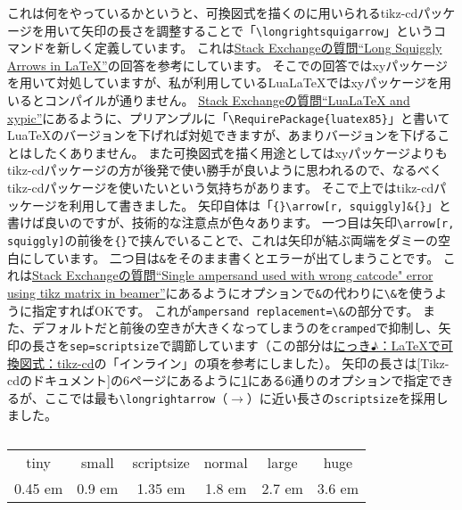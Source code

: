 \documentclass[11pt,a4paper,oneside,lualatex]{ltjsarticle} %
\newcommand{\longrightsquigarrow}{\begin{tikzcd}[cramped,sep=scriptsize,ampersand replacement=\&]{}\arrow[r, squiggly]\&{}\end{tikzcd}}
\numberwithin{equation}{section} %
\begin{document}
これは何をやっているかというと、可換図式を描くのに用いられるtikz-cdパッケージを用いて矢印の長さを調整することで「\verb|\longrightsquigarrow|」というコマンドを新しく定義しています。
これは\href{https://tex.stackexchange.com/questions/99017/long-squiggly-arrows-in-latex}{Stack Exchangeの質問``Long Squiggly Arrows in LaTeX''}の回答を参考にしています。
そこでの回答ではxyパッケージを用いて対処していますが、私が利用しているLuaLaTeXではxyパッケージを用いるとコンパイルが通りません。
\href{https://tex.stackexchange.com/questions/328602/lualatex-and-xypic}{Stack Exchangeの質問``LuaLaTeX and xypic''}にあるように、プリアンプルに「\verb|\RequirePackage{luatex85}|」と書いてLuaTeXのバージョンを下げれば対処できますが、あまりバージョンを下げることはしたくありません。
また可換図式を描く用途としてはxyパッケージよりもtikz-cdパッケージの方が後発で使い勝手が良いように思われるので、なるべくtikz-cdパッケージを使いたいという気持ちがあります。
そこで上ではtikz-cdパッケージを利用して書きました。
矢印自体は「\verb|{}\arrow[r, squiggly]&{}|」と書けば良いのですが、技術的な注意点が色々あります。
一つ目は矢印\verb|\arrow[r, squiggly]|の前後を\verb|{}|で挟んでいることで、これは矢印が結ぶ両端をダミーの空白にしています。
二つ目は\verb|&|をそのまま書くとエラーが出てしまうことです。
これは\href{https://tex.stackexchange.com/questions/15093/single-ampersand-used-with-wrong-catcode-error-using-tikz-matrix-in-beamer}{Stack Exchangeの質問``Single ampersand used with wrong catcode" error using tikz matrix in beamer''}にあるようにオプションで\verb|&|の代わりに\verb|\&|を使うように指定すればOKです。
これが\verb|ampersand replacement=\&|の部分です。
また、デフォルトだと前後の空きが大きくなってしまうのを\verb|cramped|で抑制し、矢印の長さを\verb|sep=scriptsize|で調節しています（この部分は\href{https://abenori.blogspot.com/2015/07/tikz-cd.html}{にっき♪：LaTeXで可換図式：tikz-cd}の「インライン」の項を参考にしました）。
矢印の長さは\href{https://ctan.math.washington.edu/tex-archive/graphics/pgf/contrib/tikz-cd/tikz-cd-doc.pdf}[Tikz-cdのドキュメント]の6ページにあるように\cref{tab:tikz_arrow_length}にある6通りのオプションで指定できるが、ここでは最も\verb|\longrightarrow|（$ \longrightarrow $）に近い長さの\verb|scriptsize|を採用しました。

\begin{table}[htb]
	\centering
	\setlength{\extrarowheight}{1mm} %
	\begin{tabular}{cccccc}
		tiny & small & scriptsize & normal & large & huge \\
		0.45 em & 0.9 em & 1.35 em & 1.8 em & 2.7 em & 3.6 em
	\end{tabular}
	\caption{}
	\label{tab:tikz_arrow_length}
\end{table}
\end{document}
